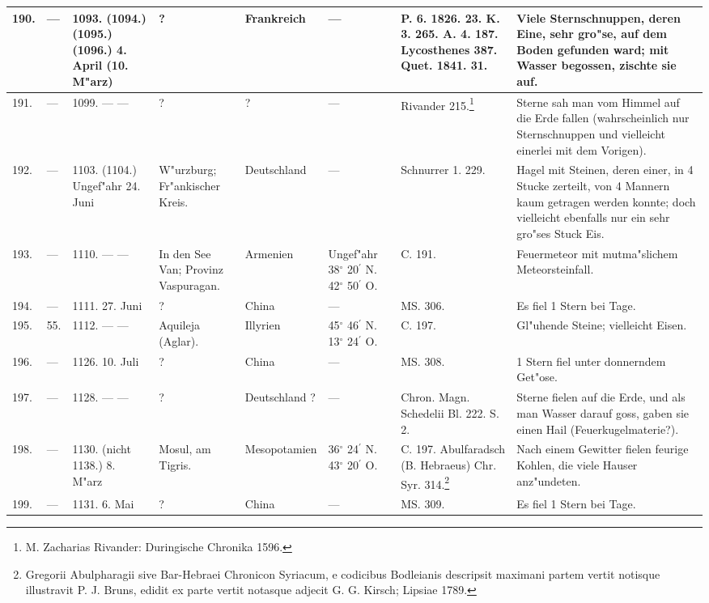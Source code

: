 \documentclass[a4paper, 8pt, oneside, polutonikogreek, german]{article}
\begin{document}
\begin{center}
\begin{longtable}{| p{4mm} | p{2mm} | p{15mm} | p{25mm} | p{16mm} | p{12mm} | p{13mm} | p{20mm} |}
        190. & --- & 1093. (1094.) (1095.) (1096.) 4. April (10. M"arz) & ? & Frankreich & --- & P. 6. 1826. 23. K. 3. 265. A. 4. 187. Lycosthenes 387. Quet. 1841. 31. & Viele Sternschnuppen, deren Eine, sehr gro"se, auf dem Boden gefunden ward; mit Wasser begossen, zischte sie auf. \\ \hline
        191. & --- & 1099. --- --- & ? & ? & --- & Rivander 215.\footnote{M. Zacharias Rivander: Duringische Chronika 1596.} & Sterne sah man vom Himmel auf die Erde fallen (wahrscheinlich nur Sternschnuppen und vielleicht einerlei mit dem Vorigen). \\ \hline
        192. & --- & 1103. (1104.) Ungef"ahr 24. Juni & W"urzburg; Fr"ankischer Kreis. & Deutschland & --- & Schnurrer 1. 229. & Hagel mit Steinen, deren einer, in 4 Stucke zerteilt, von 4 Mannern kaum getragen werden konnte; doch vielleicht ebenfalls nur ein sehr gro"ses Stuck Eis. \\ \hline
        193. & --- & 1110. --- --- & In den See Van; Provinz Vaspuragan. & Armenien & Ungef"ahr 38$^\circ$ 20$^\prime$ N. 42$^\circ$ 50$^\prime$ O. & C. 191. & Feuermeteor mit mutma"slichem Meteorsteinfall. \\ \hline
        194. & --- & 1111. 27. Juni & ? & China & --- & MS. 306. & Es fiel 1 Stern bei Tage. \\ \hline
        195. & 55. & 1112. --- --- & Aquileja (Aglar). & Illyrien & 45$^\circ$ 46$^\prime$ N. 13$^\circ$ 24$^\prime$ O. & C. 197. & Gl"uhende Steine; vielleicht Eisen. \\ \hline
        196. & --- & 1126. 10. Juli & ? & China & --- & MS. 308. & 1 Stern fiel unter donnerndem Get"ose. \\ \hline
        197. & --- & 1128. --- --- & ? & Deutschland ? & --- & Chron. Magn. Schedelii Bl. 222. S. 2. & Sterne fielen auf die Erde, und als man Wasser darauf goss, gaben sie einen Hail (Feuerkugelmaterie?). \\ \hline
        198. & --- & 1130. (nicht 1138.) 8. M"arz & Mosul, am Tigris. & Mesopotamien & 36$^\circ$ 24$^\prime$ N. 43$^\circ$ 20$^\prime$ O. & C. 197. Abulfaradsch (B. Hebraeus) Chr. Syr. 314.\footnote{Gregorii Abulpharagii sive Bar-Hebraei Chronicon Syriacum, e codicibus Bodleianis descripsit maximani partem vertit notisque illustravit P. J. Bruns, edidit ex parte vertit notasque adjecit G. G. Kirsch; Lipsiae 1789.} & Nach einem Gewitter fielen feurige Kohlen, die viele Hauser anz"undeten. \\ \hline
        199. & --- & 1131. 6. Mai & ? & China & --- & MS. 309. & Es fiel 1 Stern bei Tage. \\ \hline

\end{longtable}
\end{center}
\end{document}

